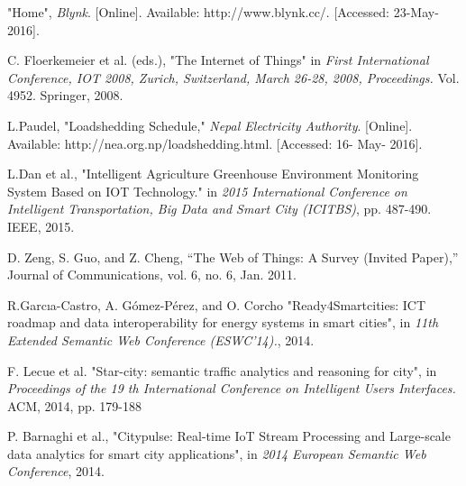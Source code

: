 \documentclass[journal,twoside]{IEEEtran}
\begin{document}

%
%
%
\begin{thebibliography}{99}

        "Home", \emph{Blynk}. [Online]. Available: http://www.blynk.cc/. [Accessed: 23-May-2016].

        C. Floerkemeier et al. (eds.), "The Internet of Things" in \emph{First International Conference, IOT 2008, Zurich, Switzerland, March 26-28, 2008, Proceedings.} 
        Vol. 4952. Springer, 2008.

        L.Paudel, "Loadshedding Schedule," \emph{Nepal Electricity Authority}. [Online]. Available: http://nea.org.np/loadshedding.html. [Accessed: 16- May- 2016].

        L.Dan et al., "Intelligent Agriculture Greenhouse Environment Monitoring System Based on IOT Technology." 
        in \emph{2015 International Conference on Intelligent Transportation, Big Data and Smart City (ICITBS)}, 
        pp. 487-490. IEEE, 2015.

        D. Zeng, S. Guo, and Z. Cheng, “The Web of Things: A Survey (Invited Paper),” Journal of Communications, vol. 6, no. 6, Jan. 2011.

        R.Garcıa-Castro, A. Gómez-Pérez, and O. Corcho
        "Ready4Smartcities: ICT roadmap and data interoperability for energy systems in smart cities", 
        in \emph{11th Extended Semantic Web Conference (ESWC’14).}, 2014.


        F. Lecue et al.
        "Star-city: semantic traffic analytics and reasoning for city", 
        in \emph{Proceedings of the 19 th International Conference on Intelligent Users Interfaces.} 
        ACM, 2014, pp. 179-188

        P. Barnaghi et al., 
        "Citypulse: Real-time IoT Stream Processing and Large-scale data analytics for smart city applications", 
        in \emph{2014 European Semantic Web Conference}, 2014.


\end{thebibliography}
\end{document}
